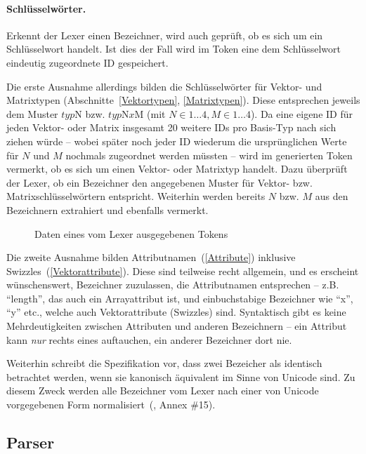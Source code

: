 \documentclass[twoside,a4paper,fleqn,12pt]{article}
\begin{document}
\paragraph{Schlüsselwörter.} Erkennt der Lexer einen Bezeichner, wird auch geprüft, ob es sich um ein Schlüsselwort handelt. Ist dies der Fall
wird im Token eine dem Schlüsselwort eindeutig zugeordnete ID gespeichert.

Die erste Ausnahme allerdings bilden die Schlüsselwörter für Vektor- und Matrixtypen (Abschnitte~\ref{Vektortypen}, \ref{Matrixtypen}). Diese entsprechen
jeweils dem Muster $\mathit{typ}\mathrm{N}$ bzw. $\mathit{typ}\mathrm{N}\mathit{x}\mathrm{M}$ (mit $N \in 1 \dots 4, M \in 1 \dots 4$).
Da eine eigene ID für jeden Vektor- oder Matrix insgesamt 20 weitere IDs pro Basis-Typ nach sich ziehen würde -- wobei später noch jeder ID wiederum
die ursprünglichen Werte für $N$ und $M$ nochmals zugeordnet
werden müssten -- wird im generierten Token vermerkt, ob es sich um einen Vektor- oder Matrixtyp handelt.
Dazu überprüft der Lexer, ob ein Bezeichner den angegebenen Muster für Vektor- bzw. Matrixschlüsselwörtern entspricht.
Weiterhin werden bereits $N$ bzw. $M$ aus den Bezeichnern extrahiert und ebenfalls vermerkt.

\begin{figure}[h]
   \centering
  
  \caption{Daten eines vom Lexer ausgegebenen Tokens}
  \label{fig:LexerToken}
\end{figure}

Die zweite Ausnahme bilden Attributnamen~(\ref{Attribute}) inklusive Swizzles~(\ref{Vektorattribute}). Diese sind teilweise recht allgemein, und
es erscheint wünschenswert, Bezeichner zuzulassen, die Attributnamen entsprechen -- z.B. ``length'', das auch ein Arrayattribut ist, und einbuchstabige
Bezeichner wie ``x'', ``y'' etc., welche auch Vektorattribute (Swizzles) sind. Syntaktisch gibt es keine Mehrdeutigkeiten zwischen Attributen und
anderen Bezeichnern -- ein Attribut kann \emph{nur} rechts eines  auftauchen, ein anderer Bezeichner dort nie.

Weiterhin schreibt die Spezifikation vor, dass zwei Bezeicher als identisch betrachtet werden, wenn sie kanonisch äquivalent im Sinne von Unicode sind.
Zu diesem Zweck werden alle Bezeichner vom Lexer nach einer von Unicode vorgegebenen Form normalisiert~(\cite{unicode}, Annex \#15).

\subsection{Parser}
\end{document}
